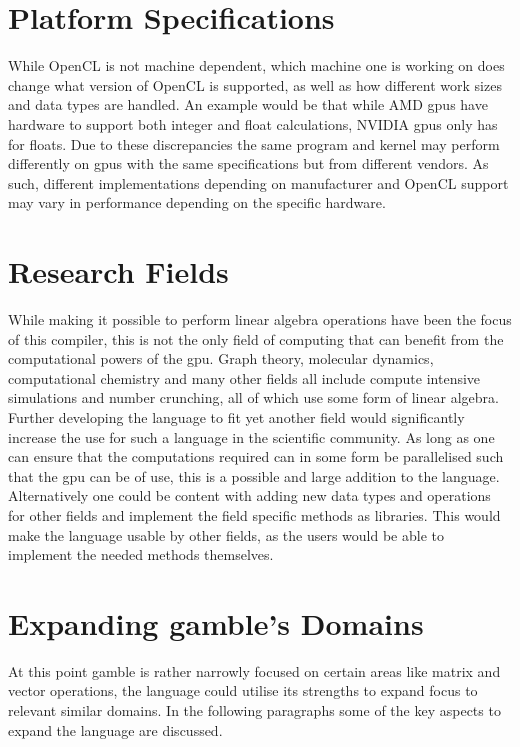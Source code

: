 \section{Platform Specifications}
While OpenCL is not machine dependent, which machine one is working on does change what version of OpenCL is supported, as well as how different work sizes and data types are handled.
An example would be that while AMD \acrshort{gpu}s have hardware to support both integer and float calculations, NVIDIA \acrshort{gpu}s only has for floats. \citep{CUDAOpenCLOptimisation} 
Due to these discrepancies the same program and kernel may perform differently on \acrshort{gpu}s with the same specifications but from different vendors.
As such, different implementations depending on manufacturer and OpenCL support may vary in performance depending on the specific hardware.

\section{Research Fields}
While making it possible to perform linear algebra operations have been the focus of this compiler, this is not the only field of computing that can benefit from the computational powers of the \acrshort{gpu}.
Graph theory, molecular dynamics, computational chemistry and many other fields all include compute intensive simulations and number crunching, all of which use some form of linear algebra.
Further developing the language to fit yet another field would significantly increase the use for such a language in the scientific community.
As long as one can ensure that the computations required can in some form be parallelised such that the \acrshort{gpu} can be of use, this is a possible and large addition to the language.
Alternatively one could be content with adding new data types and operations for other fields and implement the field specific methods as libraries.
This would make the language usable by other fields, as the users would be able to implement the needed methods themselves.

\section{Expanding \gls{gamble}'s Domains}
At this point \gls{gamble} is rather narrowly focused on certain areas like matrix and vector operations, the language could utilise its strengths to expand focus to relevant similar domains.
In the following paragraphs some of the key aspects to expand the language are discussed. 

